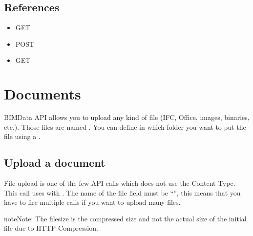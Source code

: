 \documentclass[a4paper,12pt,english]{sphinxmanual}
\begin{document}
\subsection{References}
\label{\detokenize{folders_and_documents:references}}\begin{itemize}
\item {} 
GET 

\item {} 
POST 

\item {} 
GET 

\end{itemize}


\section{Documents}
\label{\detokenize{folders_and_documents:documents}}
BIMData API allows you to upload any kind of file (IFC, Office, images, binaries, etc.). Those files are named .
You can define in which folder you want to put the file using a .


\subsection{Upload a document}
\label{\detokenize{folders_and_documents:upload-a-document}}
File upload is one of the few API calls which does not use the  Content Type. This call uses  with .
The name of the file field must be “”, this means that you have to fire multiple calls if you want to upload many files.

\begin{sphinxadmonition}{note}{Note:}
The filesize is the compressed size and not the actual size of the initial file due to HTTP Compression.
\end{sphinxadmonition}
\end{document}
